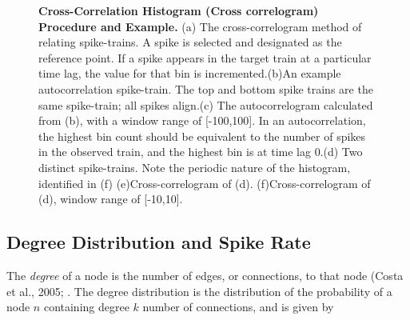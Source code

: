 \documentclass[11pt]{article}
\begin{document}
\begin{figure}[H]
\begin{minipage}{.49\linewidth}
\centering
{}
\end{minipage}
\begin{minipage}{.5\linewidth}
\centering
{}
\end{minipage}
\begin{minipage}{.49\linewidth}
\centering
{}
\end{minipage}
\begin{minipage}{.5\linewidth}
\centering
{}
\end{minipage}
\begin{minipage}{.49\linewidth}
\centering
{}
\end{minipage}
\begin{minipage}{.5\linewidth}
\centering
{}
\end{minipage}

\caption{\textbf{Cross-Correlation Histogram (Cross correlogram) Procedure and Example.} (a) The cross-correlogram method of relating spike-trains. A spike is selected and designated as the reference point. If a spike appears in the target train at a particular time lag, the value for that bin is incremented.(b)An example autocorrelation spike-train. The top and bottom spike trains are the same spike-train; all spikes align.(c) The autocorrelogram calculated from (b), with a window range of [-100,100]. In an autocorrelation, the highest bin count should be equivalent to the number of spikes in the observed train, and the highest bin is at time lag 0.(d) Two distinct spike-trains. Note the periodic nature of the histogram, identified in (f) (e)Cross-correlogram of (d). (f)Cross-correlogram of (d), window range of [-10,10].}
\label{fig:main}
\end{figure}

\subsection{Degree Distribution and Spike Rate}
The \textit{degree} of a node is the number of edges, or connections, to that node (Costa et al., 2005; . The degree distribution is the distribution of the probability of a node $n$ containing degree $k$ number of connections, and is given by 
\end{document}
